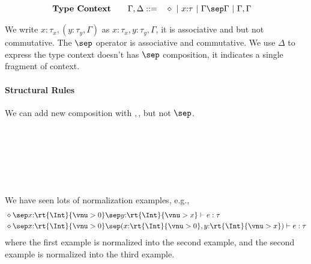 \begin{alignat*}{2}
\\\text{\textbf{Type Context}}& \quad & \Gamma, \Delta ::= \quad & \diamond ~|~ x{:}\tau ~|~ \Gamma \sep \Gamma ~|~ \Gamma , \Gamma
\end{alignat*}

We write $x{:}\tau_x, (y{:}\tau_y, \Gamma)$ as $x{:}\tau_x, y{:}\tau_y, \Gamma$, it is associative and but not commutative. The $\sep$ operator is associative and commutative.
We use $\Delta$ to express the type context doesn't has $\sep$ composition, it indicates a single fragment of context.

\paragraph{Structural Rules} We can add new composition with $,$, but not $\sep$.

\begin{figure}[!ht]
 \\[.8em]
\\[.8em]
\quad
\\[.8em]
\quad
\\[.8em]
\quad
\\[.8em]
\end{figure}

We have seen lots of normalization examples, e.g.,
\begin{align*}
    &\diamond \sep x{:}\rt{\Int}{\vnu > 0} \sep y{:}\rt{\Int}{\vnu > x} \vdash e : \tau \\
    &\diamond \sep x{:}\rt{\Int}{\vnu > 0} \sep (x{:}\rt{\Int}{\vnu > 0}, y{:}\rt{\Int}{\vnu > x}) \vdash e : \tau \\
\end{align*}\noindent
where the first example is normalized into the second example, and the second example is normalized into the third example.

